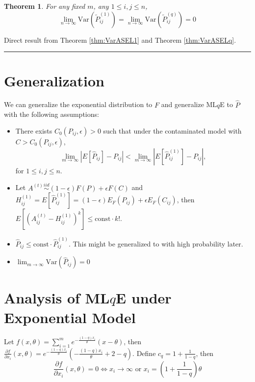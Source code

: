 \documentclass[a4paper]{article}
\newenvironment{proof}{{\bf Proof:  }}{\hfill\rule{2mm}{2mm}}
\newtheorem{theorem}[fact]{Theorem}
\begin{document}
\begin{theorem}
\label{thm:varianceL1andLq}
For any fixed $m$, any $1 \le i,j \le n$,
\[
	\lim_{n \to \infty} \mathrm{Var}(\widetilde{P}_{ij}^{(1)})
    = \lim_{n \to \infty} \mathrm{Var}(\widetilde{P}_{ij}^{(q)}) = 0
\]
\end{theorem}
\begin{proof}
Direct result from Theorem \ref{thm:VarASEL1} and Theorem \ref{thm:VarASELq}.
\end{proof}




\newpage

\section{Generalization}

We can generalize the exponential distribution to $F$ and generalize ML$q$E to $\hat{P}$ with the following assumptions:
\begin{itemize}
\item There exists $C_0(P_{ij}, \epsilon) > 0$ such that under the contaminated model with $C > C_0(P_{ij}, \epsilon)$,
\[
	\lim_{m \to \infty} \left| E[\hat{P}_{ij}] - P_{ij} \right| < 
    \lim_{m \to \infty} \left| E[\hat{P}^{(1)}_{ij}] - P_{ij} \right|,
\]
for $1 \le i, j \le n$.
\item Let $A^{(t)} \stackrel{iid}{\sim} (1-\epsilon) F(P) + \epsilon F(C) $ and $H_{ij}^{(1)} = E[\hat{P}_{ij}^{(1)}] = (1-\epsilon) E_F(P_{ij}) + \epsilon E_F(C_{ij})$, then $E[(A_{ij}^{(t)} - H_{ij}^{(1)})^k] \le \mathrm{const} \cdot k!$.
\item $\hat{P}_{ij} \le \mathrm{const} \cdot \hat{P}_{ij}^{(1)}$. This might be generalized to with high probability later.
\item $\lim_{m \rightarrow \infty} \mathrm{Var}(\hat{P}_{ij}) = 0$
\end{itemize}



\newpage

\section{Analysis of ML$q$E under Exponential Model}

Let $f(x, \theta) = \sum_{i=1}^m e^{-\frac{(1-q) x_i}{\theta}} (x - \theta)$, then $\frac{\partial f}{\partial x_i}(x, \theta) = e^{-\frac{(1-q) x_i}{\theta}} \left( - \frac{(1-q) x_i}{\theta} + 2 - q \right)$.
Define $c_q = 1 + \frac{1}{1-q}$, then
\[
	\frac{\partial f}{\partial x_i}(x, \theta) = 0 \Leftrightarrow
    x_i \to \infty \text{ or } x_i = (1 + \frac{1}{1-q}) \theta
\]
\end{document}
